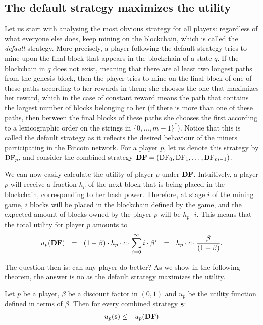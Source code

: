  \subsection{The default strategy maximizes the utility}

Let us start with analysing the most obvious strategy for all players: regardless of what everyone else does, keep mining on the blockchain, which is called the \emph{default} strategy.
More precisely, a player following the default strategy tries to mine upon the final block that appears in the blockchain of a state $q$. If the blockchain in $q$ does not exist, meaning that there are al least two longest paths from the genesis block, then the player tries to mine on the final block of one of these paths according to her rewards in them; she chooses the one that maximizes her reward, which in the case of constant reward means the path that contains the largest number of blocks belonging to her (if there is more than one of these paths, then between the final blocks of these paths she chooses the first according to a lexicographic order on the strings in $\{0, \ldots, m-1\}^*$). 
Notice that this is called the default strategy as it reflects the desired behaviour of the miners participating in the Bitcoin network.  For a player $p$, let us denote this strategy 
by $\text{\rm DF}_p$, and consider the combined strategy $\text{\rm {\bf DF}} = (\text{\rm DF}_0,\text{\rm DF}_1,\dots,\text{\rm DF}_{m-1})$. 

We can now easily calculate the utility of player $p$ under $\text{\rm {\bf DF}}$. Intuitively, a player $p$ will receive a fraction $h_p$ of the next block that is being placed in the blockchain, corresponding to her hash power. Therefore, at stage $i$ of the mining game, $i$ blocks will be placed in the blockchain defined by the game, and the expected amount of blocks owned by the player $p$ will be $h_p\cdot i$. This means that the total utility for player $p$ amounts to 
$$u_p(\cdf) \ \ = \ \ (1 - \beta) \cdot h_p \cdot c\cdot \sum_{i=0}^{\infty}i \cdot \beta^{i} \ \ =  \ \ h_p\cdot c \cdot \frac{\beta}{(1-\beta)}.$$


The question then is: can any player do better? As we show in the following theorem, the answer is no as the default strategy maximizes the utility. 
\begin{mythm}\label{thm-conts_dom_str}
Let $p$ be a player, $\beta$ be a discount factor in $(0,1)$ and $u_p$ be the utility function defined in terms of $\beta$. Then for every combined strategy $\mathbf{s}$:
\begin{eqnarray*}
u_p(\mathbf{s}) & \leq & u_p(\text{\rm {\bf DF}})
\end{eqnarray*}
\end{mythm} 

